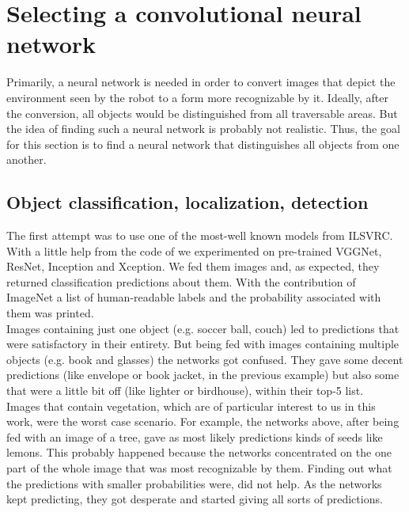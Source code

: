 \documentclass[12pt,a4paper,table,dvipsnames,tikz]{report}
\newcommand{\acronym}{\MakeUppercase}
\begin{document}
	\section{Selecting a convolutional neural network}
	\label{sec:fg:nn}
	
	Primarily, a neural network is needed in order to convert images that depict the 
	environment seen by the robot to a form more recognizable by it. Ideally, after 
	the conversion, all objects would be distinguished from all traversable areas. But 
	the idea of finding such a neural network is probably not realistic. Thus, the goal 
	for this section is to find a neural network that distinguishes all objects from 
	one another.
	\\
	
	\subsection{Object classification, localization, detection}
	\label{sec:fg:nn:obj}
	
	The first attempt was to use one of the most-well known models from \acronym{ilsvrc}. 
	With a little help from the code of \citet{Rosebrocke} we experimented on 
	pre-trained VGGNet, ResNet, Inception and Xception. We fed them images and, 
	as expected, they returned classification predictions about them. With the 
	contribution of ImageNet a list of human-readable labels and the probability 
	associated with them was printed.
	\\
	
	Images containing just one object (e.g. soccer ball, couch) led to predictions 
	that were satisfactory in their entirety. But being fed with images containing 
	multiple objects (e.g. book and glasses) the networks got confused. They gave 
	some decent predictions (like envelope or book jacket, in the previous example) 
	but also some that were a little bit off (like lighter or birdhouse), within 
	their top-5 list.
	\\
	
	Images that contain vegetation, which are of particular interest to us in this work, 
	were the worst case scenario. For example, the networks above, after being fed with 
	an image of a tree, gave as most likely predictions kinds of seeds like lemons. This 
	probably happened because the networks concentrated on the one part of the whole image 
	that was most recognizable by them. Finding out what the predictions with smaller 
	probabilities were, did not help. As the networks kept predicting, they got desperate 
	and started giving all sorts of predictions. 
	\\
	
\end{document}
